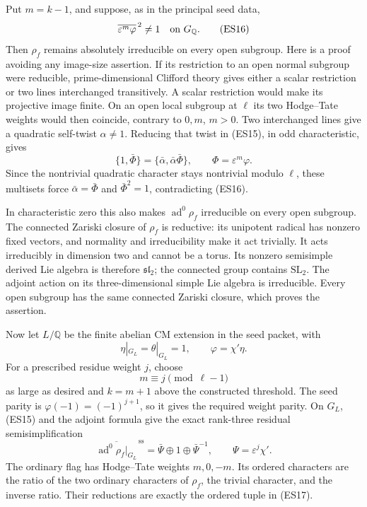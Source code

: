 Put \(m=k-1\), and suppose, as in the principal seed data,
\[
                  \overline{\varepsilon^m\varphi}^{\,2}\ne1
                         \quad\hbox{on }G_{\mathbb Q}.
 \tag{ES16}
\]
Then \(\rho_f\) remains absolutely irreducible on every
open subgroup.
Here is a proof avoiding any image-size assertion.
If its restriction to an open normal subgroup were
reducible, prime-dimensional Clifford theory gives either
a scalar restriction or two lines interchanged transitively.
A scalar restriction would make its projective image finite.
On an open local subgroup at \(\ell\) its two Hodge--Tate
weights would then coincide, contrary to \(0,m\), \(m>0\).
Two interchanged lines give a quadratic self-twist
\(\alpha\ne1\).
Reducing that twist in (ES15), in odd characteristic, gives
\[
        \{1,\bar\Phi\}=\{\bar\alpha,\bar\alpha\bar\Phi\},
                         \qquad \Phi=\varepsilon^m\varphi.
\]
Since the nontrivial quadratic character stays nontrivial
modulo \(\ell\), these multisets force
\(\bar\alpha=\bar\Phi\) and \(\bar\Phi^2=1\), contradicting
(ES16).

In characteristic zero this also makes
\(\operatorname{ad}^0\rho_f\) irreducible on every open
subgroup.
The connected Zariski closure of \(\rho_f\) is reductive:
its unipotent radical has nonzero fixed vectors, and
normality and irreducibility make it act trivially.
It acts irreducibly in dimension two and cannot be a torus.
Its nonzero semisimple derived Lie algebra is therefore
\(\mathfrak{sl}_2\); the connected group contains
\(\mathrm{SL}_2\).
The adjoint action on its three-dimensional simple Lie
algebra is irreducible.
Every open subgroup has the same connected Zariski closure,
which proves the assertion.

Now let \(L/\mathbb Q\) be the finite abelian CM extension
in the seed packet, with
\[
          \eta|_{G_L}=\theta|_{G_L}=1,\qquad
                         \varphi=\chi'\eta .
\]
For a prescribed residue weight \(j\), choose
\[
                         m\equiv j\pmod{\ell-1}
\]
as large as desired and \(k=m+1\) above the constructed
threshold.
The seed parity is
\(\varphi(-1)=(-1)^{j+1}\), so it gives the required
weight parity.
On \(G_L\), (ES15) and the adjoint formula give the exact
rank-three residual semisimplification
\[
 \overline{\operatorname{ad}^0\rho_f|_{G_L}}^{\,\mathrm{ss}}
       =\bar\Psi\oplus1\oplus\bar\Psi^{-1},
                          \qquad \Psi=\varepsilon^j\chi' .
 \tag{ES17}
\]
The ordinary flag has Hodge--Tate weights \(m,0,-m\).
Its ordered characters are the ratio of the two ordinary
characters of \(\rho_f\), the trivial character, and the
inverse ratio.
Their reductions are exactly the ordered tuple in (ES17).

